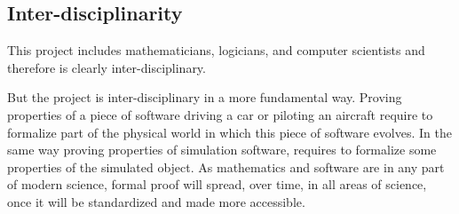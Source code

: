 \subsection{Inter-disciplinarity}
This project includes mathematicians, logicians, and computer
scientists and therefore is clearly inter-disciplinary.

But the project is inter-disciplinary in a more fundamental
way. Proving properties of a piece of software driving a car or
piloting an aircraft require to formalize part of the physical world
in which this piece of software evolves. In the same way proving
properties of simulation software, requires to formalize some
properties of the simulated object. As mathematics and software are in
any part of modern science, formal proof will spread, over time, in
all areas of science, once it will be standardized and made more
accessible.



